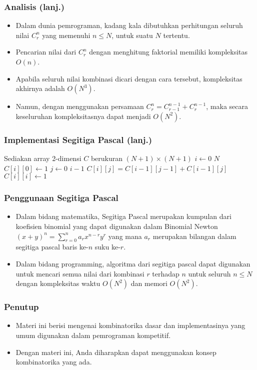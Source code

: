\begin{frame}
\frametitle{Analisis (lanj.)}
\begin{itemize}
  \item Dalam dunia pemrograman, kadang kala dibutuhkan perhitungan seluruh nilai $C^{n}_{r}$ yang memenuhi $n \le N$, untuk suatu $N$ tertentu.
  \item Pencarian nilai dari $C^{n}_{r}$ dengan menghitung faktorial memiliki kompleksitas $O(n)$.
  \item Apabila seluruh nilai kombinasi dicari dengan cara tersebut, kompleksitas akhirnya adalah $O(N^3)$.
  \item Namun, dengan menggunakan persamaan $C^{n}_{r} = C^{n-1}_{r-1} + C^{n-1}_{r}$, maka secara keseluruhan kompleksitasnya dapat menjadi $O(N^{2})$.
\end{itemize}
\end{frame}

\begin{frame}[fragile]
\frametitle{Implementasi Segitiga Pascal (lanj.)}
\begin{codebox}
\li \Comment Sediakan array 2-dimensi $C$ berukuran $(N+1) \times (N+1)$
\li \For $i \gets 0$ \To $N$
    \Do
\li   $C[i][0] \gets 1$
\li   \For $j \gets 0$ \To $i-1$
      \Do
\li     $C[i][j] = C[i-1][j-1] + C[i-1][j]$
      \End
\li   $C[i][i] \gets 1$
    \End
\end{codebox}
\end{frame}

\begin{frame}
\frametitle{Penggunaan Segitiga Pascal}
\begin{itemize}
  \item Dalam bidang matematika, Segitiga Pascal merupakan kumpulan dari koefisien binomial yang dapat digunakan dalam Binomial Newton $(x+y)^{n} = \sum\limits_{r=0}^{n} a_{r} x^{n-r} y^{r}$ yang mana $a_{r}$ merupakan bilangan dalam segitiga pascal baris ke-$n$ suku ke-$r$.
  \item Dalam bidang programming, algoritma dari segitiga pascal dapat digunakan untuk mencari semua nilai dari kombinasi $r$ terhadap $n$ untuk seluruh $n \le N$ dengan kompleksitas waktu $O(N^{2})$ dan memori $O(N^{2})$.
\end{itemize}
\end{frame}

\begin{frame}
\frametitle{Penutup}
\begin{itemize}
  \item Materi ini berisi mengenai kombinatorika dasar dan implementasinya yang umum digunakan dalam pemrograman kompetitif.
  \item Dengan materi ini, Anda diharapkan dapat menggunakan konsep kombinatorika yang ada.
\end{itemize}
\end{frame}


